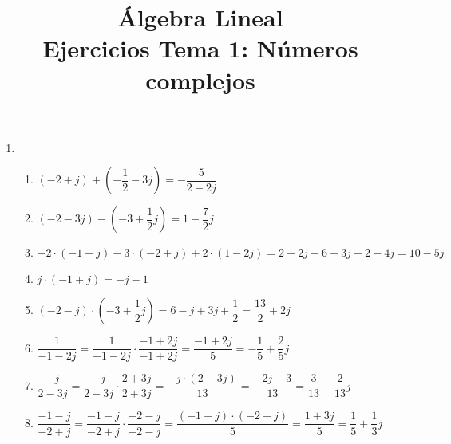 
\title{Álgebra Lineal\\Ejercicios Tema 1: Números complejos}


\maketitle
\begin{enumerate}[label=\color{red}\textbf{\arabic*)}]
    \item {}
        \begin{enumerate}[label=\color{red}\textbf{\textbf{\alph*)}}]
            \item {} 

                $(-2+j)+\left( -\dfrac{1}{2}-3j \right)=-\dfrac{5}{2-2j} $
            \item {}
                
                $(-2-3j)-\left( -3+\dfrac{1}{2}j \right)=1-\dfrac{7}{2}j $
            \item {} 

                $-2\cdot (-1-j)-3\cdot (-2+j)+2\cdot (1-2j)=2+2j+6-3j+2-4j=10-5j$
            \item {} 

                $j\cdot (-1+j)=-j-1$
            \item {} 

                $(-2-j)\cdot \left( -3+\dfrac{1}{2}j \right) =6-j+3j+\dfrac{1}{2}=\dfrac{13}{2}+2j$
            \item {} 

                $\dfrac{1}{-1-2j}=\dfrac{1}{-1-2j}\cdot \dfrac{-1+2j}{-1+2j}=\dfrac{-1+2j}{5}=-\dfrac{1}{5}+\dfrac{2}{5}j $
            \item {} 

                $\dfrac{-j}{2-3j}=\dfrac{-j}{2-3j}\cdot \dfrac{2+3j}{2+3j}=\dfrac{-j\cdot (2-3j)}{13}=\dfrac{-2j+3}{13}=\dfrac{3}{13}-\dfrac{2}{13}j$
            \item {} 

                $\dfrac{-1-j}{-2+j}=\dfrac{-1-j}{-2+j}\cdot \dfrac{-2-j}{-2-j}=\dfrac{(-1-j)\cdot (-2-j)}{5}=\dfrac{1+3j}{5}=\dfrac{1}{5}+\dfrac{1}{3}j$


\end{enumerate}
\end{enumerate}
